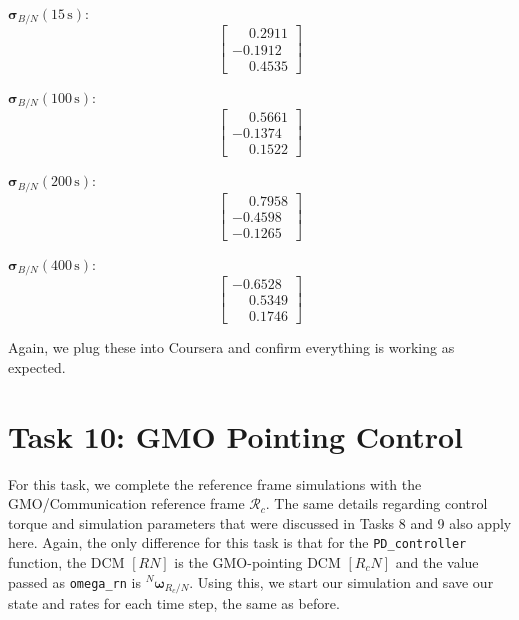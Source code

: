 \documentclass[conf]{new-aiaa}
\begin{document}
$\bm{\sigma}_{B/N}(15\,\text{s})$:
\[
\begin{bmatrix}
\phantom{-}0.2911 \\
-0.1912 \\
\phantom{-}0.4535
\end{bmatrix}
\]

$\bm{\sigma}_{B/N}(100\,\text{s})$:
\[
\begin{bmatrix}
\phantom{-}0.5661 \\
-0.1374 \\
\phantom{-}0.1522
\end{bmatrix}
\]

$\bm{\sigma}_{B/N}(200\,\text{s})$:
\[
\begin{bmatrix}
\phantom{-}0.7958 \\
-0.4598 \\
-0.1265
\end{bmatrix}
\]

$\bm{\sigma}_{B/N}(400\,\text{s})$:
\[
\begin{bmatrix}
-0.6528 \\
\phantom{-}0.5349 \\
\phantom{-}0.1746
\end{bmatrix}
\]

Again, we plug these into Coursera and confirm everything is working as expected.

\section{Task 10: GMO Pointing Control}
For this task, we complete the reference frame simulations with the GMO/Communication reference frame $\mathcal{R}_c$. The same details regarding control torque and simulation parameters that were discussed in Tasks 8 and 9 also apply here. Again, the only difference for this task is that for the \texttt{PD\_controller} function, the DCM $[RN]$ is the GMO-pointing DCM $[R_cN]$ and the value passed as \texttt{omega\_rn} is ${}^N\bm\omega_{R_c/N}$. Using this, we start our simulation and save our state and rates for each time step, the same as before. 
\end{document}
